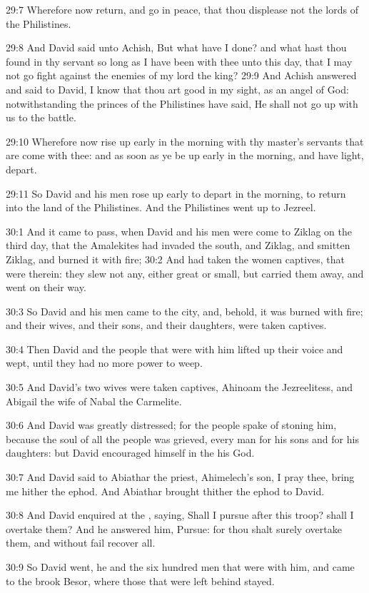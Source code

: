 29:7 Wherefore now return, and go in peace, that thou displease not the lords of the Philistines.

29:8 And David said unto Achish, But what have I done? and what hast thou found in thy servant so long as I have been with thee unto this day, that I may not go fight against the enemies of my lord the king?  29:9 And Achish answered and said to David, I know that thou art good in my sight, as an angel of God: notwithstanding the princes of the Philistines have said, He shall not go up with us to the battle.

29:10 Wherefore now rise up early in the morning with thy master's servants that are come with thee: and as soon as ye be up early in the morning, and have light, depart.

29:11 So David and his men rose up early to depart in the morning, to return into the land of the Philistines. And the Philistines went up to Jezreel.

30:1 And it came to pass, when David and his men were come to Ziklag on the third day, that the Amalekites had invaded the south, and Ziklag, and smitten Ziklag, and burned it with fire; 30:2 And had taken the women captives, that were therein: they slew not any, either great or small, but carried them away, and went on their way.

30:3 So David and his men came to the city, and, behold, it was burned with fire; and their wives, and their sons, and their daughters, were taken captives.

30:4 Then David and the people that were with him lifted up their voice and wept, until they had no more power to weep.

30:5 And David's two wives were taken captives, Ahinoam the Jezreelitess, and Abigail the wife of Nabal the Carmelite.

30:6 And David was greatly distressed; for the people spake of stoning him, because the soul of all the people was grieved, every man for his sons and for his daughters: but David encouraged himself in the \LORD his God.

30:7 And David said to Abiathar the priest, Ahimelech's son, I pray thee, bring me hither the ephod. And Abiathar brought thither the ephod to David.

30:8 And David enquired at the \LORD, saying, Shall I pursue after this troop? shall I overtake them? And he answered him, Pursue: for thou shalt surely overtake them, and without fail recover all.

30:9 So David went, he and the six hundred men that were with him, and came to the brook Besor, where those that were left behind stayed.

